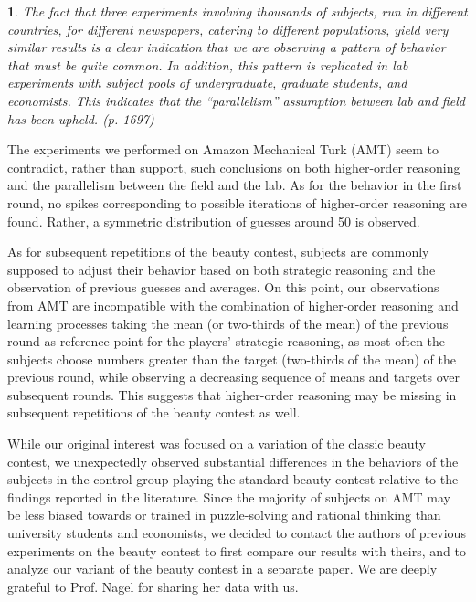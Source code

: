 \documentclass[12pt,review]{elsarticle}
\newtheorem{fact}[thm]{\protect\factname}
\providecommand{\factname}{Fact}
\begin{document}
\begin{fact}
\label{fact:parallelism}The fact that three experiments involving
thousands of subjects, run in different countries, for different newspapers,
catering to different populations, yield very similar results is a
clear indication that we are observing a pattern of behavior that
must be quite common. In addition, this pattern is replicated in lab
experiments with subject pools of undergraduate, graduate students,
and economists. This indicates that the \textquotedblleft parallelism\textquotedblright{}
assumption between lab and field has been upheld. (p. 1697) 
\end{fact}

The experiments we performed on Amazon Mechanical Turk (AMT) seem
to contradict, rather than support, such conclusions on both higher-order
reasoning and the parallelism between the field and the lab. As for
the behavior in the first round, no spikes corresponding to possible
iterations of higher-order reasoning are found. Rather, a symmetric
distribution of guesses around 50 is observed.

As for subsequent repetitions of the beauty contest, subjects are
commonly supposed to adjust their behavior based on both strategic
reasoning and the observation of previous guesses and averages. On
this point, our observations from AMT are incompatible with the combination
of higher-order reasoning and learning processes taking the mean (or
two-thirds of the mean) of the previous round as reference point for
the players' strategic reasoning, as most often the subjects choose
numbers greater than the target (two-thirds of the mean) of the previous
round, while observing a decreasing sequence of means and targets
over subsequent rounds. This suggests that higher-order reasoning
may be missing in subsequent repetitions of the beauty contest as
well.

While our original interest was focused on a variation of the classic
beauty contest, we unexpectedly observed substantial differences in
the behaviors of the subjects in the control group playing the standard
beauty contest relative to the findings reported in the literature.
Since the majority of subjects on AMT may be less biased towards or
trained in puzzle-solving and rational thinking than university students
and economists, we decided to contact the authors of previous experiments
on the beauty contest to first compare our results with theirs, and
to analyze our variant of the beauty contest in a separate paper.
We are deeply grateful to Prof. Nagel for sharing her data with us.
\end{document}
